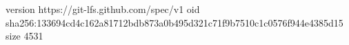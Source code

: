 version https://git-lfs.github.com/spec/v1
oid sha256:133694cd4c162a81712bdb873a0b495d321c71f9b7510c1c0576f944e4385d15
size 4531
